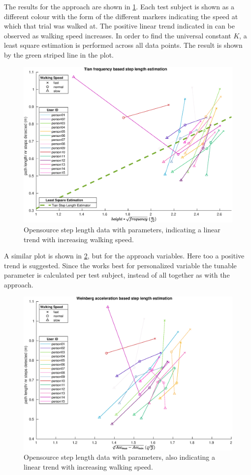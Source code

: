 The results for the \citet{Tian2016} approach are shown in \cref{fig:step_length_tian}. Each test subject is shown as a different colour with the form of the different markers indicating the speed at which that trial was walked at. The positive linear trend indicated in \cite{Tian2016} can be observed as walking speed increases. In order to find the universal constant $K$, a least square estimation is performed across all data points. The result is shown by the green striped line in the plot. 

	\begin{figure}[H]
	\centering
	\includegraphics[width=0.8\linewidth]{images/20201113_1634_tian}
	\caption{Opensource step length data with \citet{Tian2016} parameters, indicating a linear trend with increasing walking speed.}
	\label{fig:step_length_tian}
	\end{figure}
	
A similar plot is shown in \cref{fig:step_length_weinberg}, but for the \citet{Weinberg2002} approach variables. Here too a positive trend is suggested. Since the \citet{Weinberg2002} works best for personalized variable the tunable parameter is calculated per test subject, instead of all together as with the \citet{Tian2016} approach. 

\begin{figure}[H]
	\centering
	\includegraphics[width=0.8\linewidth]{images/20201113_1639_weinberg}
	\caption{Opensource step length data with \citet{Weinberg2002} parameters, also indicating a linear trend with increasing walking speed.}
	\label{fig:step_length_weinberg}
\end{figure}

